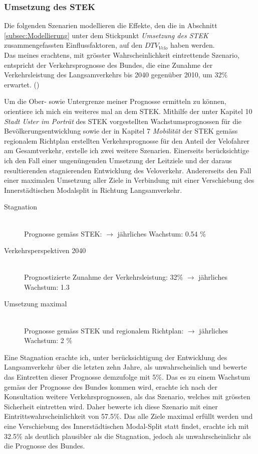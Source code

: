 \subsubsection*{Umsetzung des STEK}
\label{subsubsec:Umsetzung}

Die folgenden Szenarien modellieren die Effekte, den die in Abschnitt \ref{subsec:Modellierung} unter dem Stickpunkt \textit{Umsetzung des STEK} zusammengefassten Einflussfaktoren, auf den $DTV_{Velo}$ haben werden. \\

Das meines erachtens, mit grösster Wahrscheinlichkeit eintrettende Szenario, entspricht der Verkehrsprognosse des Bundes, die eine Zunahme der Verkehrsleistung des Langsamverkehrs bis 2040 gegenüber 2010, um 32\% erwartet. (\cite{Perspektive2040}) 

Um die Ober- sowie Untergrenze meiner Prognosse ermitteln zu können, orientiere ich mich ein weiteres mal an dem STEK. Mithilfe der unter Kapitel 10 \textit{Stadt Uster im Porträt} des STEK vorgestellten Wachstumsprognossen für die Bevölkerungsentwicklung sowie der in Kapitel 7 \textit{Mobilität} der STEK gemäss regionalem Richtplan erstellten Verkehrsprognosse für den Anteil der Velofahrer am Gesamtverkehr, erstelle ich zwei weitere Szenarien. 
Einerseits berücksichtige ich den Fall einer ungenüngenden Umsetzung der Leitziele und der daraus resultierenden stagnierenden Entwicklung des Veloverkehr. Andererseits den Fall einer maximalen Umsetzung aller Ziele in Verbindung mit einer Verschiebung des Innerstädtischen Modalsplit in Richtung Langsamverkehr.

\begin{description}
\item[Stagnation] \hfill \\
Prognosse gemäss STEK: $\rightarrow$ jährliches Wachstum: 0.54 \% 
\item[Verkehrsperspektiven 2040] \hfill \\
Prognostizierte Zunahme der Verkehrsleistung: 32\% $\rightarrow$ jährliches Wachstum: 1.3 
\item[Umsetzung maximal] \hfill \\
Prognosse gemäss STEK und regionalem Richtplan: $\rightarrow$ jährliches Wachstum: 2 \% 
\end{description}

Eine Stagnation erachte ich, unter berücksichtigung der Entwicklung des Langsamverkehr über die letzten zehn Jahre, als unwahrscheinlich und bewerte das Eintretten dieser Prognosse demzufolge mit 5\%.
Das es zu einem Wachstum gemäss der Prognosse des Bundes kommen wird, erachte ich nach der Konsultation weitere Verkehrsprognossen, als das Szenario, welches mit grössten Sicherheit eintretten wird. Daher bewerte ich diese Szenario mit einer Eintrittswahrscheinlichkeit von 57.5\%. 
Das alle Ziele maximal erfüllt werden und eine Verschiebung des Innerstädtischen Modal-Split statt findet, erachte ich mit 32.5\% als deutlich plausibler als die Stagnation, jedoch als unwahrscheinlichr als die Prognosse des Bundes. 

